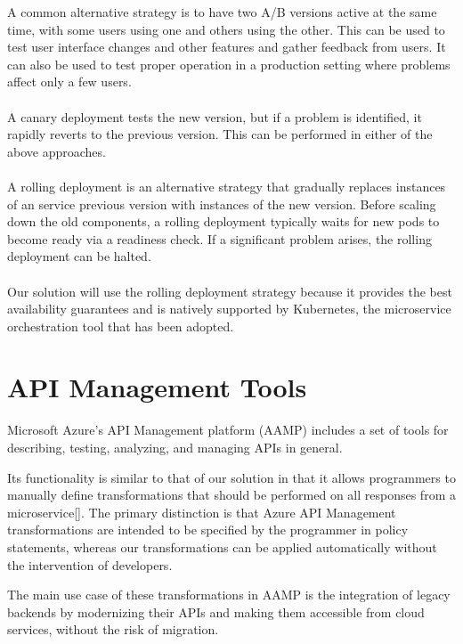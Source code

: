 A common alternative strategy is to have two A/B versions active at the same time, with some users using one and others using the other.
This can be used to test user interface changes and other features and gather feedback from users.
It can also be used to test proper operation in a production setting where problems affect only a few users.

\paragraph{}

A canary deployment tests the new version, but if a problem is identified, it rapidly reverts to the previous version.
This can be performed in either of the above approaches.

\paragraph{}

A rolling deployment is an alternative strategy that gradually replaces instances of an service previous version with instances of the new version.
Before scaling down the old components, a rolling deployment typically waits for new pods to become ready via a readiness check.
If a significant problem arises, the rolling deployment can be halted.

\paragraph{}

Our solution will use the rolling deployment strategy because it provides the best availability guarantees
and is natively supported by Kubernetes, the microservice orchestration tool that has been adopted.

\section{API Management Tools} %
\label{sec:api_management_tools}

Microsoft Azure's API Management platform (AAMP) includes a set of tools for describing, testing, analyzing, and managing APIs in general.

Its functionality is similar to that of our solution in that it allows programmers to manually define transformations that should be performed on all responses from a microservice[].
The primary distinction is that Azure API Management transformations are intended to be specified by the programmer in policy statements, whereas our transformations can be applied automatically without the intervention of developers.

The main use case of these transformations in AAMP is the integration of legacy backends by modernizing their APIs and making them accessible from cloud services, without the risk of migration.

